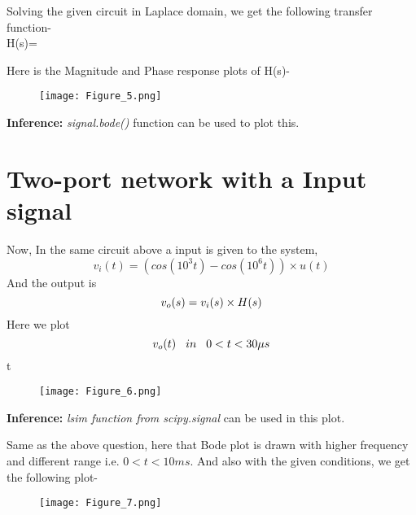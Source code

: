 \documentclass[12pt]{article}
\begin{document}
Solving the given circuit in Laplace domain, we get the following transfer function-\\


H(s)= 

Here is the Magnitude and Phase response plots of H(s)-

\begin{figure}[h!]
\centering
\texttt{[image: Figure\_5.png]}
\label{fig:exemplo}
\end{figure}
 
\textbf{Inference:} {\sl signal.bode()\/} function can be used to plot this.

\newpage
\section*{Two-port network with a Input signal}

Now, In the same circuit above a input is given to the system,\\
\begin{equation*}
    v_{i}(t)=(cos(10^3t)-cos(10^6t))\times u(t)
\end{equation*}
And the output is 
\begin{equation*}
    v_{o}(s)=v_{i}(s)\times H(s)\\
\end{equation*}
Here we plot 
\begin{equation*}
v_{o}(t) \hspace{0.3cm}in\hspace{0.3cm}  0 < t < 30\mu s\\    
\end{equation*}t


\begin{figure}[h!]
\centering
\texttt{[image: Figure\_6.png]}
\label{fig:exemplo}
\end{figure}

\textbf{Inference:} {\sl lsim function from scipy.signal\/} can be used in this plot.

\newpage
Same as the above question, here that Bode plot is drawn with higher frequency and different range i.e. $0 < t < 10ms$. And also with the given conditions, we get the following plot-

\begin{figure}[h!]
\centering
\texttt{[image: Figure\_7.png]}
\label{fig:exemplo}
\end{figure}
\end{document}
